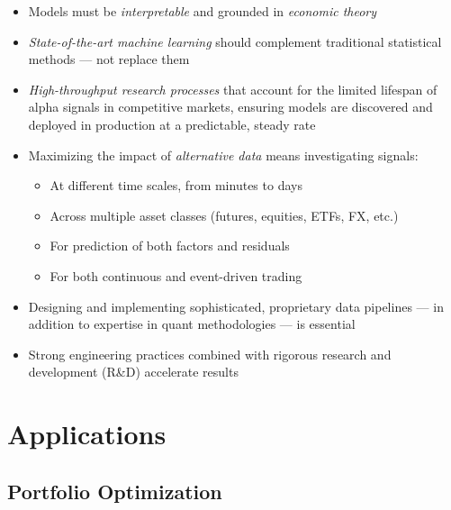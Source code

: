 \documentclass[11pt, letterpaper]{article}
\begin{document}
  \begin{itemize}
    \item Models must be \textit{interpretable} and grounded in \textit{economic
      theory}

    \item \textit{State-of-the-art machine learning} should complement
      traditional statistical methods --- not replace them

    \item \textit{High-throughput research processes} that account for the
      limited lifespan of alpha signals in competitive markets, ensuring models
      are discovered and deployed in production at a predictable, steady rate

    \item Maximizing the impact of \textit{alternative data} means
      investigating signals:

      \begin{itemize}
        \item At different time scales, from minutes to days

        \item Across multiple asset classes (futures, equities, ETFs, FX,
          etc.)

        \item For prediction of both factors and residuals

        \item For both continuous and event-driven trading
      \end{itemize}

    \item Designing and implementing sophisticated, proprietary data
      pipelines --- in addition to expertise in quant methodologies --- is
      essential

    \item Strong engineering practices combined with rigorous research and
      development (R\&D) accelerate results
  \end{itemize}

  \section{Applications}
  \label{applications}

  \subsection{Portfolio Optimization}
  \label{portfolio-optimization}
\end{document}
